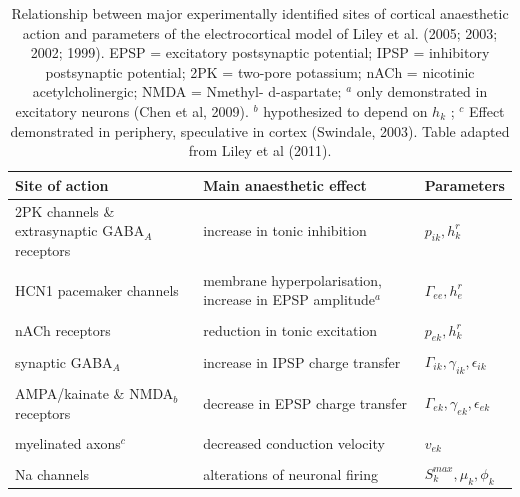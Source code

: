 \documentclass[a4paper,12pt]{article}
\begin{document}
\begin{table}[h]
\label{table:site_of_action} 
\begin{tabular}{p{5cm} p{5cm} l}
\hline 
 Site of action & Main anaesthetic effect & Parameters \\
\hline
2PK channels \& extrasynaptic GABA$_A$ receptors & increase in tonic inhibition & $p_{ik}, h_k^r$ \\
\\
HCN1 pacemaker channels & membrane hyperpolarisation, increase in EPSP amplitude$^a$ & $\Gamma_{ee}, h_e^r$\\
\\
nACh receptors & reduction in tonic excitation & $p_{ek}, h_k^r$ \\
\\
synaptic GABA$_A$ & increase in IPSP charge transfer & $\Gamma_{ik}, \gamma_{ik}, \epsilon_{ik}$\\
\\
AMPA/kainate \& NMDA$_b$ receptors & decrease in EPSP charge transfer & $\Gamma_{ek}, \gamma_{ek}, \epsilon_{ek}$\\
\\
myelinated axons$^c$ & decreased conduction velocity & $v_{ek}$\\
\\
Na channels & alterations of neuronal firing & $S_k^{max}, \mu_k, \phi_k$\\
\hline
\end{tabular}
\caption{Relationship between major experimentally identified sites of
cortical anaesthetic action and parameters of the electrocortical model
of Liley et al. (2005; 2003; 2002; 1999). EPSP = excitatory
postsynaptic potential; IPSP = inhibitory postsynaptic potential; 2PK =
two-pore potassium; nACh = nicotinic acetylcholinergic; NMDA = Nmethyl-
d-aspartate; $^a$ only demonstrated in excitatory neurons (Chen
et al, 2009). $^b$ hypothesized to depend on $h_k$ ; $^c$ Effect demonstrated
in periphery, speculative in cortex (Swindale, 2003). Table adapted
from Liley et al (2011).}
\end{table}
\end{document}
